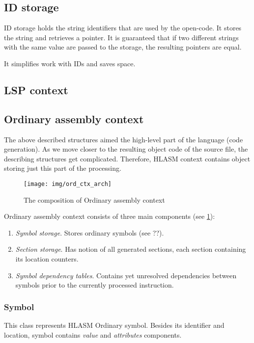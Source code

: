 \subsection{ID storage}

ID storage holds the string identifiers that are used by the open-code. 
It stores the string and retrieves a pointer. It is guaranteed that if two different strings with the same value are passed to the storage, the resulting pointers are equal.

It simplifies work with IDs and saves space. 

\subsection{LSP context}

\subsection{Ordinary assembly context}

The above described structures aimed the high-level part of the language (code generation). As we move closer to the resulting object code of the source file, the describing structures get complicated. Therefore, HLASM context contains object storing just this part of the processing.

\begin{figure}
	\centering
	\texttt{[image: img/ord\_ctx\_arch]}
	\caption{The composition of Ordinary assembly context}
	\label{fig06:ord_ctx}
\end{figure}

Ordinary assembly context consists of three main components (see \cref{fig06:ord_ctx}):
\begin{enumerate}
	\item \emph{Symbol storage}. Stores ordinary symbols (see ??).
	\item \emph{Section storage}. Has notion of all generated sections, each section containing its location counters.
	\item \emph{Symbol dependency tables}. Contains yet unresolved dependencies between symbols prior to the currently processed instruction.
\end{enumerate}

\subsubsection{Symbol}

This class represents HLASM Ordinary symbol. Besides its identifier and location, symbol contains \emph{value} and \emph{attributes} components.

